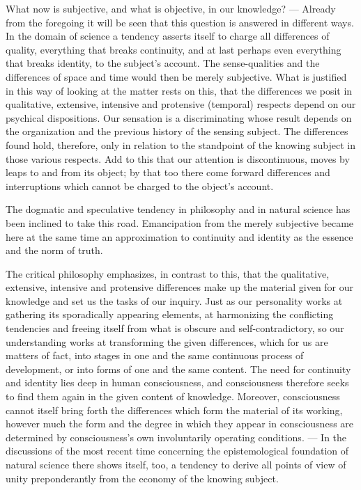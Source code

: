 \documentclass[12pt,a4paper]{book}
\newcommand{\opage}[1]{\marginnote{\footnotesize\textit{[#1]}}}
\begin{document}
What now is subjective, and what is objective, in our knowledge? --- Already
from the foregoing it will be seen that this question is answered in different
ways. In the domain of science a tendency asserts itself to charge all
differences of quality, everything that breaks continuity, and at last perhaps
even everything that breaks identity, to \opage{49}the subject's account. The
sense-qualities and the differences of space and time would then be merely
subjective. What is justified in this way of looking at the matter rests on this,
that the differences we posit in qualitative, extensive, intensive and protensive
(temporal) respects depend on our psychical dispositions. Our sensation is a
discriminating whose result depends on the organization and the previous history
of the sensing subject. The differences found hold, therefore, only in relation
to the standpoint of the knowing subject in those various respects. Add to this
that our attention is discontinuous, moves by leaps to and from its object; by
that too there come forward differences and interruptions which cannot be charged
to the object's account.

The dogmatic and speculative tendency in philosophy and in natural science has
been inclined to take this road. Emancipation from the merely subjective became
here at the same time an approximation to continuity and identity as the essence
and the norm of truth.

The critical philosophy emphasizes, in contrast to this, that the qualitative,
extensive, intensive and protensive differences make up the material given for
our knowledge and set us the tasks of our inquiry. Just as our personality works
at gathering its sporadically appearing elements, at harmonizing the conflicting
tendencies and freeing itself from what is obscure and self-contradictory, so our
understanding works at transforming the given differences, which for us are
matters of fact, into stages in one and the same continuous process of
development, or into forms of one and the same content. The need for continuity
and identity lies deep in human consciousness, and consciousness therefore seeks
to find them again in the given content of knowledge. Moreover, consciousness
cannot itself bring forth the differences which form the material of its working,
however much the form and the degree in which they appear in consciousness are
determined by consciousness's own involuntarily operating conditions. --- In the
discussions of the most recent time concerning the epistemological foundation of
natural science there shows itself, too, a tendency to derive all points of view
of unity preponderantly from the economy of the knowing subject.
\end{document}
